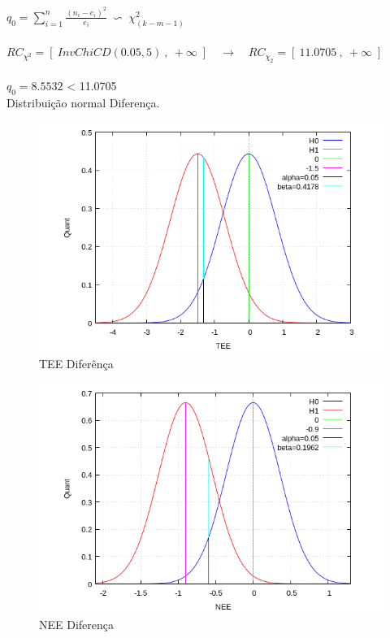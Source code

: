 $q_0=\sum_{i=1}^n \frac{(n_i-e_i)^2}{e_i} \;\backsim\; \chi_{(k-m-1)}^2$ \\
\\
$RC_{\chi^2}=\left[ \: InvChiCD(0.05,5) \:,\: +\infty \; \right] \quad \rightarrow \quad RC_{\chi_2}=\left[ \: 11.0705 \:,\: +\infty \; \right]$ \\
\\
$q_0=8.5532$ < 11.0705 \\
Distribuição normal Diferença. \\
\begin{minipage}[!b]{0.45\linewidth}
	\begin{figure}[H]
		\centering
		\includegraphics[scale=0.4]{./image/ESTAT/TEE_DIFF.png}
		\caption{TEE Diferênça}
		\label{TEEDIFF}
	\end{figure}
\end{minipage}
\hspace{1cm}
\begin{minipage}[!b]{0.45\linewidth}
	\begin{figure}[H]
		\centering
		\includegraphics[scale=0.4]{./image/ESTAT/NEE_DIFF.png}
		\caption{NEE Diferença}
		\label{NEEDIFF}
	\end{figure}
\end{minipage} \\
